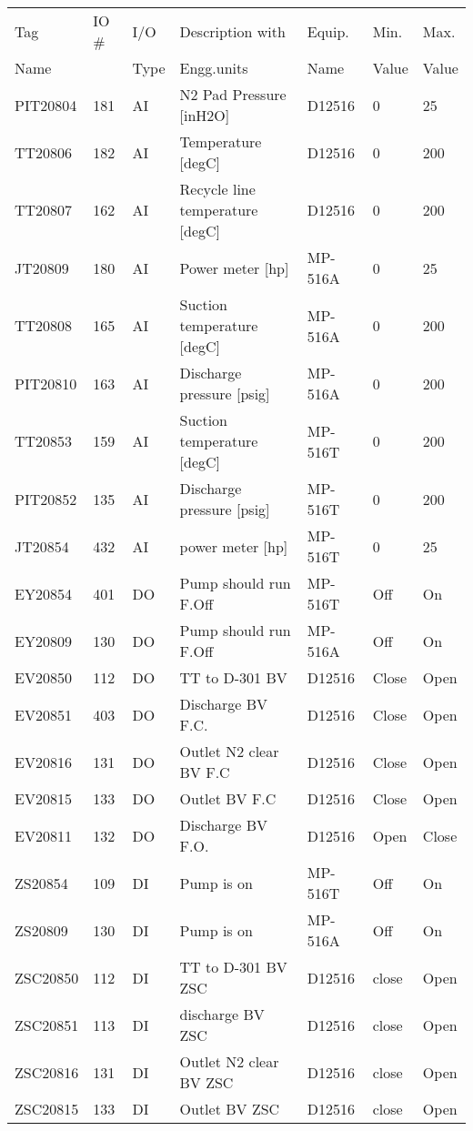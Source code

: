 \documentclass[a4paper,oneside]{article}
\begin{document}
\begin{center}
\begin{tabular}{lllllll}
Tag & IO \# & I/O & Description with & Equip. & Min. & Max.\\
Name &  & Type & Engg.units & Name & Value & Value\\
\hline
PIT20804 & 181 & AI & N2 Pad Pressure [inH2O] & D12516 & 0 & 25\\
TT20806 & 182 & AI & Temperature [degC] & D12516 & 0 & 200\\
TT20807 & 162 & AI & Recycle line temperature [degC] & D12516 & 0 & 200\\
JT20809 & 180 & AI & Power meter [hp] & MP-516A & 0 & 25\\
TT20808 & 165 & AI & Suction temperature [degC] & MP-516A & 0 & 200\\
PIT20810 & 163 & AI & Discharge pressure [psig] & MP-516A & 0 & 200\\
TT20853 & 159 & AI & Suction temperature [degC] & MP-516T & 0 & 200\\
PIT20852 & 135 & AI & Discharge pressure [psig] & MP-516T & 0 & 200\\
JT20854 & 432 & AI & power meter [hp] & MP-516T & 0 & 25\\
EY20854 & 401 & DO & Pump should run F.Off & MP-516T & Off & On\\
EY20809 & 130 & DO & Pump should run F.Off & MP-516A & Off & On\\
EV20850 & 112 & DO & TT to D-301 BV & D12516 & Close & Open\\
EV20851 & 403 & DO & Discharge BV F.C. & D12516 & Close & Open\\
EV20816 & 131 & DO & Outlet N2 clear BV F.C & D12516 & Close & Open\\
EV20815 & 133 & DO & Outlet BV F.C & D12516 & Close & Open\\
EV20811 & 132 & DO & Discharge BV F.O. & D12516 & Open & Close\\
ZS20854 & 109 & DI & Pump is on & MP-516T & Off & On\\
ZS20809 & 130 & DI & Pump is on & MP-516A & Off & On\\
ZSC20850 & 112 & DI & TT to D-301 BV ZSC & D12516 & close & Open\\
ZSC20851 & 113 & DI & discharge BV ZSC & D12516 & close & Open\\
ZSC20816 & 131 & DI & Outlet N2 clear BV ZSC & D12516 & close & Open\\
ZSC20815 & 133 & DI & Outlet BV ZSC & D12516 & close & Open\\

\end{tabular}
\end{center}
\end{document}

